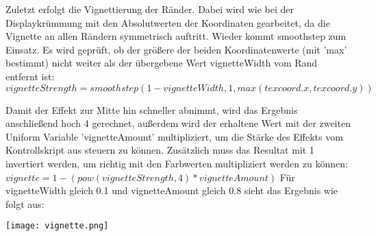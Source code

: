 Zuletzt erfolgt die Vignettierung der Ränder. Dabei wird wie bei der Displaykrümmung mit den Absolutwerten der Koordinaten gearbeitet, da die Vignette an allen Rändern symmetrisch auftritt. Wieder kommt smoothstep zum Einsatz. Es wird geprüft, ob der grö{\ss}ere der beiden Koordinatenwerte (mit 'max' bestimmt) nicht weiter als der übergebene Wert vignetteWidth vom Rand entfernt ist: $vignetteStrength = smoothstep(1 - vignetteWidth, 1, max(texcoord.x, texcoord.y))$

Damit der Effekt zur Mitte hin schneller abnimmt, wird das Ergebnis anschlie{\ss}end hoch 4 gerechnet, au{\ss}erdem wird der erhaltene Wert mit der zweiten Uniform Variable 'vignetteAmount' multipliziert, um die Stärke des Effekts vom Kontrollskript aus steuern zu können. Zusätzlich muss das Resultat mit 1 invertiert werden, um richtig mit den Farbwerten multipliziert werden zu können: $vignette = 1 - (pow(vignetteStrength, 4) * vignetteAmount)$
Für vignetteWidth gleich 0.1 und vignetteAmount gleich 0.8 sieht das Ergebnis wie folgt aus:

\texttt{[image: vignette.png]}
